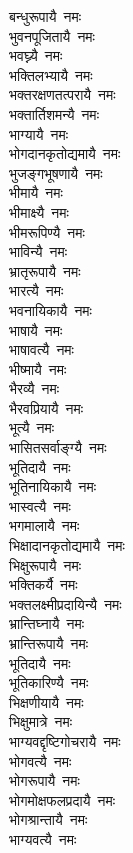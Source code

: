 \begin{flushleft}
\begin{multicols}{2}
बन्धुरूपायै~नमः\\
भुवनपूजितायै~नमः\hfill{}\\
भवघ्न्यै~नमः\\
भक्तिलभ्यायै~नमः\\
भक्तरक्षणतत्परायै~नमः\\
भक्तार्तिशमन्यै~नमः\\
भाग्यायै~नमः\\
भोगदानकृतोद्यमायै~नमः\\
भुजङ्गभूषणायै~नमः\\
भीमायै~नमः\\
भीमाक्ष्यै~नमः\\
भीमरूपिण्यै~नमः\hfill{}\\
भाविन्यै~नमः\\
भ्रातृरूपायै~नमः\\
भारत्यै~नमः\\
भवनायिकायै~नमः\\
भाषायै~नमः\\
भाषावत्यै~नमः\\
भीष्मायै~नमः\\
भैरव्यै~नमः\\
भैरवप्रियायै~नमः\\
भूत्यै~नमः\hfill{}\\
भासितसर्वाङ्ग्यै~नमः\\
भूतिदायै~नमः\\
भूतिनायिकायै~नमः\\
भास्वत्यै~नमः\\
भगमालायै~नमः\\
भिक्षादानकृतोद्यमायै~नमः\\
भिक्षुरूपायै~नमः\\
भक्तिकर्यै~नमः\\
भक्तलक्ष्मीप्रदायिन्यै~नमः\\
भ्रान्तिघ्नायै~नमः\hfill{}\\
भ्रान्तिरूपायै~नमः\\
भूतिदायै~नमः\\
भूतिकारिण्यै~नमः\\
भिक्षणीयायै~नमः\\
भिक्षुमात्रे~नमः\\
भाग्यवद्दृष्टिगोचरायै~नमः\\
भोगवत्यै~नमः\\
भोगरूपायै~नमः\\
भोगमोक्षफलप्रदायै~नमः\\
भोगश्रान्तायै~नमः\hfill{}\\
भाग्यवत्यै~नमः\\

\end{multicols}
\end{flushleft}
